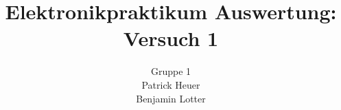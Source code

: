 \documentclass{beamer}
\title{Elektronikpraktikum Auswertung: Versuch 1}
\author{Gruppe 1 \\ Patrick Heuer \\ Benjamin Lotter}
\date{}
\begin{document}
\frame{\titlepage}


%
%
    
\end{document}
